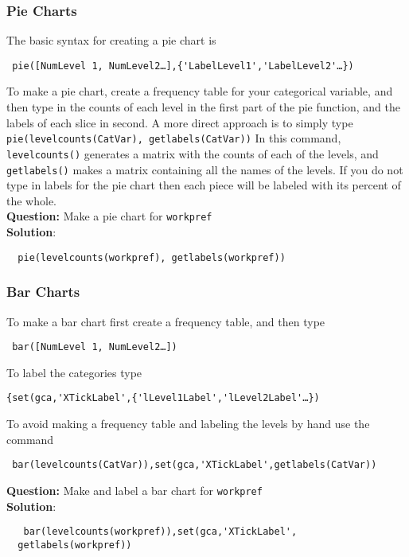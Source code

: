 \documentclass[10pt]{article}
\begin{document}
 \subsubsection{Pie Charts}
The basic syntax for creating a pie chart is 
\begin{verbatim} pie([NumLevel 1, NumLevel2…],{'LabelLevel1','LabelLevel2'…}) \end{verbatim}
To make a pie chart, create a frequency table for your categorical variable, and then type in the counts of each level in the first part of the pie function, and the labels of each slice in second. A more direct approach is to simply type \texttt{pie(levelcounts(CatVar), getlabels(CatVar))} In this command, \texttt{levelcounts()} generates a matrix with the counts of each of the levels, and \texttt{getlabels()} makes a matrix containing all the names of the levels. If you do not type in labels for the pie chart then each piece will be labeled with its percent of the whole.
\\\textbf{Question:}
 Make a pie chart for \texttt{workpref}
 \\\textbf{Solution}: 
  \begin{verbatim}  pie(levelcounts(workpref), getlabels(workpref))\end{verbatim}
   \subsubsection{Bar Charts}To make a bar chart first create a frequency table, and then type 
\begin{verbatim} bar([NumLevel 1, NumLevel2…]) \end{verbatim}
To label the categories type
 \begin{verbatim}{set(gca,'XTickLabel',{'lLevel1Label','lLevel2Label'…}) \end{verbatim}
  To avoid making a frequency table and labeling the levels by hand use the command 
 \begin{verbatim} bar(levelcounts(CatVar)),set(gca,'XTickLabel',getlabels(CatVar)) \end{verbatim}
\textbf{Question:}
 Make and label a bar chart for \texttt{workpref}
 \\\textbf{Solution}: 
  \begin{verbatim}   bar(levelcounts(workpref)),set(gca,'XTickLabel',
  getlabels(workpref)) \end{verbatim}
\end{document}
